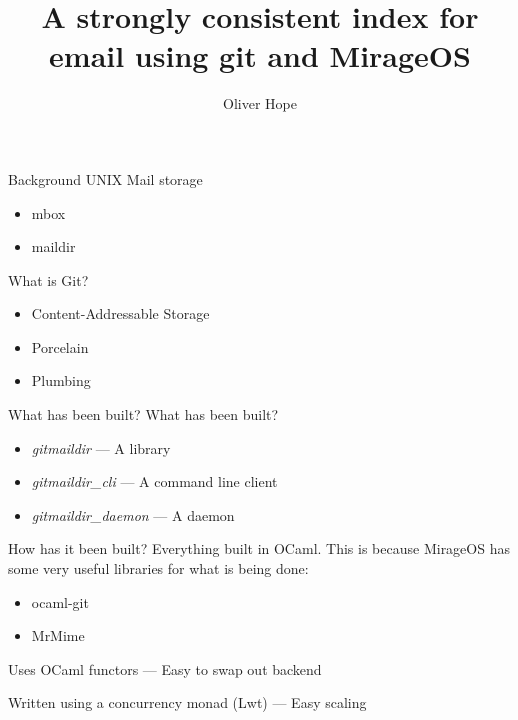 \documentclass{beamer}
\title{A strongly consistent index for email using git and MirageOS}
\date{}
\author{Oliver Hope}
\institute{Jesus College}
\begin{document}
  \maketitle

  \begin{frame}[fragile]{Background}
    UNIX Mail storage

    \begin{itemize}
      \item mbox
      \item maildir
    \end{itemize}

    What is Git?

    \begin{itemize}
      \item Content-Addressable Storage
      \item Porcelain
      \item Plumbing
    \end{itemize}
  \end{frame}

  \begin{frame}[fragile]{What has been built?}
    What has been built?

    \begin{itemize}
      \item \emph{gitmaildir} --- A library
      \item \emph{gitmaildir\_cli} --- A command line client
      \item \emph{gitmaildir\_daemon} --- A daemon
    \end{itemize}
  \end{frame}

  \begin{frame}{How has it been built?}
    Everything built in OCaml. This is because MirageOS has some very useful libraries for what is being done:

    \begin{itemize}
      \item ocaml-git
      \item MrMime
    \end{itemize}

    Uses OCaml functors --- Easy to swap out backend

    Written using a concurrency monad (Lwt) --- Easy scaling
  \end{frame}
\end{document}
